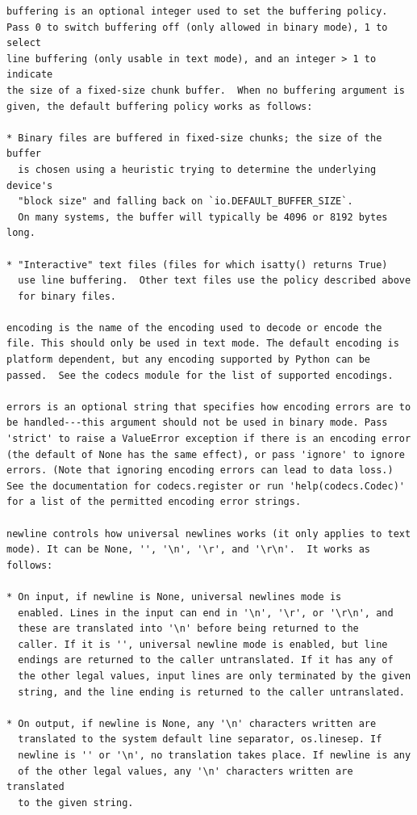 \documentclass[
  letterpaper,
  DIV=11,
  numbers=noendperiod]{scrreprt}
\begin{document}
\begin{verbatim}
buffering is an optional integer used to set the buffering policy.
Pass 0 to switch buffering off (only allowed in binary mode), 1 to select
line buffering (only usable in text mode), and an integer > 1 to indicate
the size of a fixed-size chunk buffer.  When no buffering argument is
given, the default buffering policy works as follows:

* Binary files are buffered in fixed-size chunks; the size of the buffer
  is chosen using a heuristic trying to determine the underlying device's
  "block size" and falling back on `io.DEFAULT_BUFFER_SIZE`.
  On many systems, the buffer will typically be 4096 or 8192 bytes long.

* "Interactive" text files (files for which isatty() returns True)
  use line buffering.  Other text files use the policy described above
  for binary files.

encoding is the name of the encoding used to decode or encode the
file. This should only be used in text mode. The default encoding is
platform dependent, but any encoding supported by Python can be
passed.  See the codecs module for the list of supported encodings.

errors is an optional string that specifies how encoding errors are to
be handled---this argument should not be used in binary mode. Pass
'strict' to raise a ValueError exception if there is an encoding error
(the default of None has the same effect), or pass 'ignore' to ignore
errors. (Note that ignoring encoding errors can lead to data loss.)
See the documentation for codecs.register or run 'help(codecs.Codec)'
for a list of the permitted encoding error strings.

newline controls how universal newlines works (it only applies to text
mode). It can be None, '', '\n', '\r', and '\r\n'.  It works as
follows:

* On input, if newline is None, universal newlines mode is
  enabled. Lines in the input can end in '\n', '\r', or '\r\n', and
  these are translated into '\n' before being returned to the
  caller. If it is '', universal newline mode is enabled, but line
  endings are returned to the caller untranslated. If it has any of
  the other legal values, input lines are only terminated by the given
  string, and the line ending is returned to the caller untranslated.

* On output, if newline is None, any '\n' characters written are
  translated to the system default line separator, os.linesep. If
  newline is '' or '\n', no translation takes place. If newline is any
  of the other legal values, any '\n' characters written are translated
  to the given string.


\end{verbatim}
\end{document}
